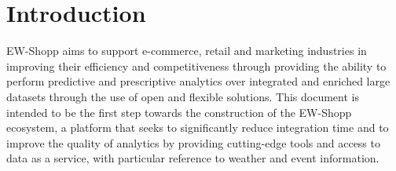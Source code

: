 \section{Introduction}

EW-Shopp aims to support e-commerce, retail and marketing industries in improving their efficiency and competitiveness through providing the ability to perform predictive and prescriptive analytics over integrated and enriched large datasets through the use of open and flexible solutions. 
This document is intended to be the first step towards the construction of the EW-Shopp ecosystem, a platform that seeks to significantly reduce integration time and to improve the quality of analytics by providing cutting-edge tools and access to data as a service, with particular reference to weather and event information.  


